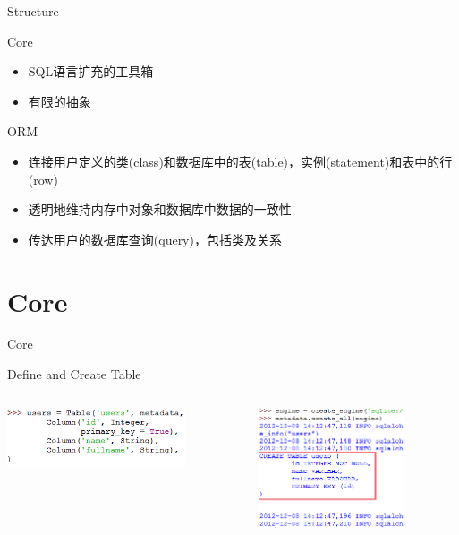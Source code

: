 \documentclass{beamer}
\begin{document}
\begin{frame}{Structure}
\begin{block}{Core}
\begin{itemize}
\item SQL语言扩充的工具箱
\item 有限的抽象
\end{itemize}

\end{block}
\begin{block}{ORM}
\begin{itemize}
\item 连接用户定义的类(class)和数据库中的表(table)，实例(statement)和表中的行(row)
\item 透明地维持内存中对象和数据库中数据的一致性
\item 传达用户的数据库查询(query)，包括类及关系
\end{itemize}
\end{block}
\end{frame}

\section{Core}
\begin{frame}{Core}
\begin{block}{Define and Create Table}
\begin{center}
\begin{columns}
\begin{column}{4cm}
    \includegraphics[height=50pt]{oop_image/core_table.png}
\end{column}

\begin{column}{5cm}
    \includegraphics[height=100pt]{oop_image/sql_table.png}
\end{column}
\end{columns}
\end{center}
\end{block}
\end{frame}
\end{document}
